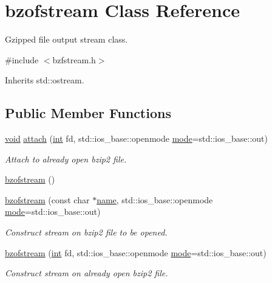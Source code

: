 \hypertarget{classbzofstream}{}\section{bzofstream Class Reference}
\label{classbzofstream}


Gzipped file output stream class.  




{\ttfamily \#include $<$bzfstream.\+h$>$}



Inherits std\+::ostream.

\subsection*{Public Member Functions}
\begin{DoxyCompactItemize}
\item 
\hyperlink{lp__lib_8h_ac7828c7b2b31d2e11af17bdb6289c5d9}{void} \hyperlink{classbzofstream_a3f1f39a5be6fc416c5382d3c5bad05f2}{attach} (\hyperlink{lp__lib_8h_adeb9ec6400320e4923ac9d836d509ddb}{int} fd, std\+::ios\+\_\+base\+::openmode \hyperlink{ioapi_8h_ab77191763734fbb3e515371393ccb606}{mode}=std\+::ios\+\_\+base\+::out)
\begin{DoxyCompactList}\small\item\em Attach to already open bzip2 file. \end{DoxyCompactList}\item 
\hyperlink{classbzofstream_aca9a7c301511e8fd4e3f999ce0cea80e}{bzofstream} ()
\item 
\hyperlink{classbzofstream_a039338b800e61a5f834a0bdb971eba77}{bzofstream} (const char $\ast$\hyperlink{lp__lib_8h_a2946c588fc7fa2fa5b43ac54b7872725}{name}, std\+::ios\+\_\+base\+::openmode \hyperlink{ioapi_8h_ab77191763734fbb3e515371393ccb606}{mode}=std\+::ios\+\_\+base\+::out)
\begin{DoxyCompactList}\small\item\em Construct stream on bzip2 file to be opened. \end{DoxyCompactList}\item 
\hyperlink{classbzofstream_a5999079b494827ad2c653c2d045f0e9b}{bzofstream} (\hyperlink{lp__lib_8h_adeb9ec6400320e4923ac9d836d509ddb}{int} fd, std\+::ios\+\_\+base\+::openmode \hyperlink{ioapi_8h_ab77191763734fbb3e515371393ccb606}{mode}=std\+::ios\+\_\+base\+::out)
\begin{DoxyCompactList}\small\item\em Construct stream on already open bzip2 file. \end{DoxyCompactList}\item 

\end{DoxyCompactItemize}
